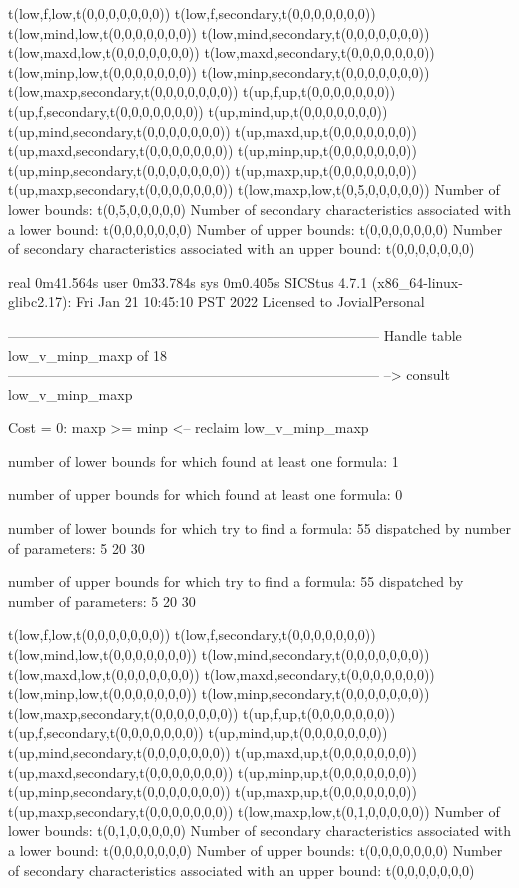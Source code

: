 t(low,f,low,t(0,0,0,0,0,0,0))
t(low,f,secondary,t(0,0,0,0,0,0,0))
t(low,mind,low,t(0,0,0,0,0,0,0))
t(low,mind,secondary,t(0,0,0,0,0,0,0))
t(low,maxd,low,t(0,0,0,0,0,0,0))
t(low,maxd,secondary,t(0,0,0,0,0,0,0))
t(low,minp,low,t(0,0,0,0,0,0,0))
t(low,minp,secondary,t(0,0,0,0,0,0,0))
t(low,maxp,secondary,t(0,0,0,0,0,0,0))
t(up,f,up,t(0,0,0,0,0,0,0))
t(up,f,secondary,t(0,0,0,0,0,0,0))
t(up,mind,up,t(0,0,0,0,0,0,0))
t(up,mind,secondary,t(0,0,0,0,0,0,0))
t(up,maxd,up,t(0,0,0,0,0,0,0))
t(up,maxd,secondary,t(0,0,0,0,0,0,0))
t(up,minp,up,t(0,0,0,0,0,0,0))
t(up,minp,secondary,t(0,0,0,0,0,0,0))
t(up,maxp,up,t(0,0,0,0,0,0,0))
t(up,maxp,secondary,t(0,0,0,0,0,0,0))
t(low,maxp,low,t(0,5,0,0,0,0,0))
Number of lower bounds:                                             t(0,5,0,0,0,0,0)
Number of secondary characteristics associated with a lower bound:  t(0,0,0,0,0,0,0)
Number of upper bounds:                                             t(0,0,0,0,0,0,0)
Number of secondary characteristics associated with an upper bound: t(0,0,0,0,0,0,0)

real	0m41.564s
user	0m33.784s
sys	0m0.405s
SICStus 4.7.1 (x86_64-linux-glibc2.17): Fri Jan 21 10:45:10 PST 2022
Licensed to JovialPersonal


--------------------------------------------------------------------------------
Handle table low_v_minp_maxp of 18
--------------------------------------------------------------------------------
--> consult low_v_minp_maxp

Cost =  0:  maxp >= minp
<-- reclaim low_v_minp_maxp

number of lower bounds for which found at least one formula: 1

number of upper bounds for which found at least one formula: 0

number of lower bounds for which try to find a formula: 55
dispatched by number of parameters: 5  20  30

number of upper bounds for which try to find a formula: 55
dispatched by number of parameters: 5  20  30

t(low,f,low,t(0,0,0,0,0,0,0))
t(low,f,secondary,t(0,0,0,0,0,0,0))
t(low,mind,low,t(0,0,0,0,0,0,0))
t(low,mind,secondary,t(0,0,0,0,0,0,0))
t(low,maxd,low,t(0,0,0,0,0,0,0))
t(low,maxd,secondary,t(0,0,0,0,0,0,0))
t(low,minp,low,t(0,0,0,0,0,0,0))
t(low,minp,secondary,t(0,0,0,0,0,0,0))
t(low,maxp,secondary,t(0,0,0,0,0,0,0))
t(up,f,up,t(0,0,0,0,0,0,0))
t(up,f,secondary,t(0,0,0,0,0,0,0))
t(up,mind,up,t(0,0,0,0,0,0,0))
t(up,mind,secondary,t(0,0,0,0,0,0,0))
t(up,maxd,up,t(0,0,0,0,0,0,0))
t(up,maxd,secondary,t(0,0,0,0,0,0,0))
t(up,minp,up,t(0,0,0,0,0,0,0))
t(up,minp,secondary,t(0,0,0,0,0,0,0))
t(up,maxp,up,t(0,0,0,0,0,0,0))
t(up,maxp,secondary,t(0,0,0,0,0,0,0))
t(low,maxp,low,t(0,1,0,0,0,0,0))
Number of lower bounds:                                             t(0,1,0,0,0,0,0)
Number of secondary characteristics associated with a lower bound:  t(0,0,0,0,0,0,0)
Number of upper bounds:                                             t(0,0,0,0,0,0,0)
Number of secondary characteristics associated with an upper bound: t(0,0,0,0,0,0,0)

